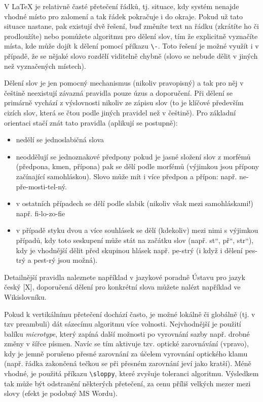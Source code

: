 \documentclass[male,czech,api_bc]{kitheses}
\newcommand{\UV}[1]{\quotedblbase#1\textquotedblleft}
\begin{document}
V \LaTeX{} je relativně časté přetečení řádků, tj. situace, kdy systém nenajde vhodné místo pro zalomení a tak řádek pokračuje i do okraje. Pokud už tato situace nastane, pak existují dvě řešení, buď změníte text na řádku (zkrátíte ho či prodloužíte) nebo pomůžete algoritmu pro dělení slov, tím že explicitně vyznačíte místa, kde může dojít k dělení pomocí příkazu \verb!\-!. Toto řešení je možné využít i v případě, že se nějaké slovo rozdělí viditelně chybně (slovo se nebude dělit v jiných než vyznačených místech).

Dělení slov je jen pomocný mechanismus (nikoliv pravopisný) a tak pro něj v češtině neexistují závazná pravidla pouze úzus a doporučení. Při dělení se primárně vychází z výslovnosti nikoliv ze zápisu slov (to je klíčové především cizích slov, která se čtou podle jiných pravidel než v češtině). Pro základní orientaci stačí znát tato pravidla (aplikují se postupně):

\begin{itemize}
\item nedělí se jednoslabičná slova
\item neoddělují se jednoznakové předpony
pokud je jasné složení slov z morfémů (předpona, kmen, přípona) pak se dělí podle morfémů (výjimkou jsou přípony začínající samohláskou). Slovo může mít i více předpon a přípon: např. ne-pře-mosti-tel-ný.
\item v ostatních případech se dělí podle slabik (nikoliv však mezi samohláskami!) např. fi-lo-zo-fie
\item v případě styku dvou a více souhlásek se dělí (kdekoliv) mezi nimi s výjimkou případů, kdy toto seskupení může stát na začátku slov (např. \UV{st}, \UV{př}, \UV{str}), kdy je vhodnější dělit před skupinou hlásek např. pe-strý (i když i dělení pes-trý a pest-rý jsou možná).
\end{itemize}

Detailnější pravidla naleznete například v jazykové poradně Ústavu pro jazyk český [X], doporučená dělení pro konkrétní slova můžete nalézt například ve Wikislovníku.

Pokud k vertikálnímu přetečení dochází často, je možné lokálně či globálně (tj. v tzv preambuli) dát sázecímu algoritmu více volnosti. Nejvhodnější je použití balíku \textit{microtype}, který zapíná další možnosti po vyrovnání sazby např. drobné změny v šířce písmen. Navíc se tím aktivuje tzv. optické zarovnávání (vpravo), kdy je jemně porušeno přesné zarovnání za účelem vyrovnání optického klamu (např. řádka zakončená tečkou se při přesném zarovnání jeví jako kratší). Méně vhodné, je použitá příkazu \verb!\sloppy!, které zvyšuje toleranci algoritmu. Výsledkem tak může být odstranění některých přetečení, za cenu příliš velkých mezer mezi slovy (efekt je podobný MS Wordu).
\end{document}
